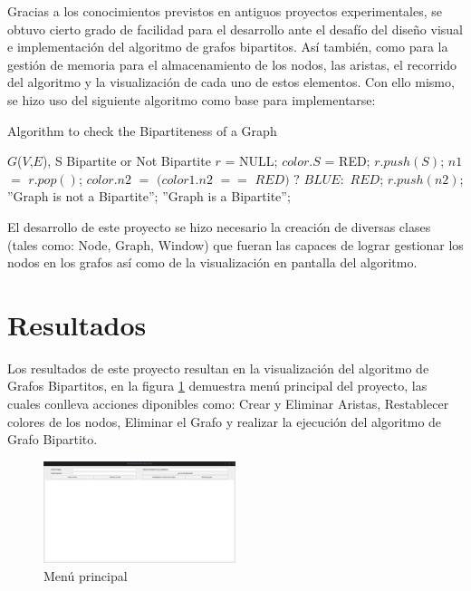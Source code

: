 \documentclass[conference]{IEEEtran}
\begin{document}
Gracias a los conocimientos previstos en antiguos proyectos experimentales, se obtuvo cierto grado de facilidad para el desarrollo ante el desafío del diseño visual e implementación del algoritmo de grafos bipartitos. Así también, como para la gestión de memoria para el almacenamiento de los nodos, las aristas, el recorrido del algoritmo y la visualización de cada uno de estos elementos. Con ello mismo, se hizo uso del siguiente algoritmo como base para implementarse:

\begin{algorithm}
\caption{Algorithm to check the Bipartiteness of a Graph}
\begin{algorithmic}[1]
\REQUIRE $G$($V$,$E$), S
\ENSURE Bipartite or Not Bipartite
\STATE $r$ = NULL;
\STATE $color.S$ = RED;
\STATE $r.push(S)$;
    \STATE $n1$ $=$ $r.pop()$;
            \STATE $color.n2$ $=$ $(color1.n2$ $==$ $RED)$ $?$ $BLUE:$ $RED$;
            \STATE $r.push(n2)$;
        \ELSE
                \RETURN ''Graph is not a Bipartite'';
            \ENDIF
        \ENDIF
    \ENDFOR
    \RETURN ''Graph is a Bipartite'';
\ENDWHILE
\end{algorithmic}
\end{algorithm}

El desarrollo de este proyecto se hizo necesario la creación de diversas clases (tales como: Node, Graph, Window) que fueran las capaces de lograr gestionar los nodos en los grafos así como de la visualización en pantalla del algoritmo.

\section{Resultados}
Los resultados de este proyecto resultan en la visualización del algoritmo de Grafos Bipartitos, en la figura \ref{fig:menu} demuestra menú principal del proyecto, las cuales conlleva acciones diponibles como: Crear y Eliminar Aristas, Restablecer colores de los nodos, Eliminar el Grafo y realizar la ejecución del algoritmo de Grafo Bipartito.

\begin{figure}[htbp]
    \includegraphics[width=0.5\textwidth]{images/menu.png} 
    \caption{Menú principal}
    \label{fig:menu}
\end{figure}
\end{document}

